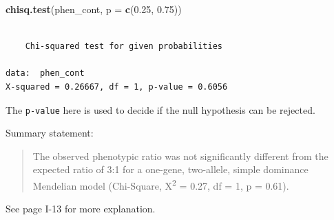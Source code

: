 \documentclass[twoside, 12pt]{article}
\newenvironment{Shaded}{\begin{snugshade}}{\end{snugshade}}
\newcommand{\KeywordTok}[1]{\textcolor[rgb]{0.13,0.29,0.53}{\textbf{{#1}}}}
\newcommand{\DataTypeTok}[1]{\textcolor[rgb]{0.13,0.29,0.53}{{#1}}}
\newcommand{\FloatTok}[1]{\textcolor[rgb]{0.00,0.00,0.81}{{#1}}}
\newcommand{\NormalTok}[1]{{#1}}
\begin{document}
\begin{Shaded}
\begin{Highlighting}[]
\KeywordTok{chisq.test}\NormalTok{(phen_cont, }\DataTypeTok{p =} \KeywordTok{c}\NormalTok{(}\FloatTok{0.25}\NormalTok{, }\FloatTok{0.75}\NormalTok{))}
\end{Highlighting}
\end{Shaded}

\begin{Verbatim}[frame=single]

    Chi-squared test for given probabilities

data:  phen_cont
X-squared = 0.26667, df = 1, p-value = 0.6056
\end{Verbatim}

The \texttt{p-value} here is used to decide if the null hypothesis can
be rejected.

Summary statement:

\begin{quote}
The observed phenotypic ratio was not significantly different from the
expected ratio of 3:1 for a one-gene, two-allele, simple dominance
Mendelian model (Chi-Square, X\textsuperscript{2} = 0.27, df = 1, p =
0.61).
\end{quote}

See page I-13 for more explanation.

\end{document}
